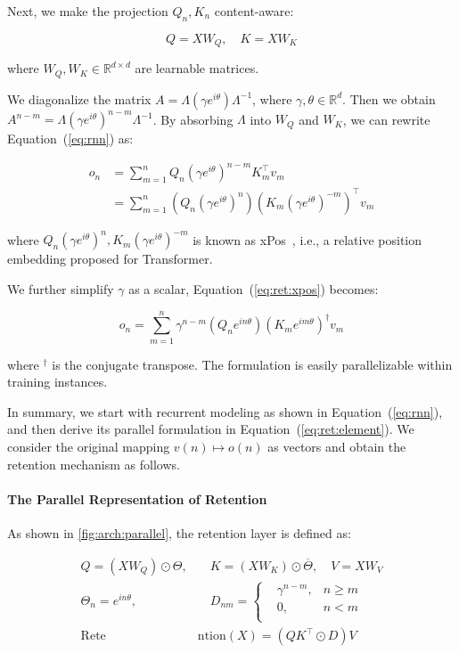 Next, we make the projection $Q_n, K_n$ content-aware:

\begin{equation}
\label{eq:content:aware}
Q = X W_Q, \quad K = X W_K
\end{equation}

where $W_Q, W_K \in \mathbb{R}^{d\times d}$ are learnable matrices.

We diagonalize the matrix $A = \Lambda(\gamma e^{i \theta})\Lambda^{-1}$, where $\gamma, \theta \in \mathbb{R}^d$.
Then we obtain $A^{n - m} = \Lambda (\gamma e^{i\theta})^{n - m} \Lambda^{-1}$.
By absorbing $\Lambda$ into $W_Q$ and $W_K$, we can rewrite Equation~(\ref{eq:rnn}) as:

\begin{equation}
\begin{aligned}
\label{eq:ret:xpos}
o_n &= \sum_{m=1}^n Q_n (\gamma e^{i\theta})^{n - m}  K_m^\intercal v_m \\
&=\sum_{m=1}^n(Q_n(\gamma e^{i\theta})^n)(K_m(\gamma e^{i\theta})^{-m})^\intercal v_m
\end{aligned}
\end{equation}

where $Q_n(\gamma e^{i\theta})^n, K_m(\gamma e^{i\theta})^{-m}$ is known as xPos~\cite{lex}, i.e., a relative position embedding proposed for Transformer.

We further simplify $\gamma$ as a scalar, Equation~(\ref{eq:ret:xpos}) becomes:

\begin{equation}
\label{eq:ret:element}
o_n = \sum_{m=1}^n \gamma^{n-m} (Q_n e^{in\theta})(K_m e^{im\theta})^\dag v_m
\end{equation}

where $^\dag$ is the conjugate transpose. The formulation is easily parallelizable within training instances.

In summary, we start with recurrent modeling as shown in Equation~(\ref{eq:rnn}), and then derive its parallel formulation in Equation~(\ref{eq:ret:element}).
We consider the original mapping $v(n) \mapsto o(n)$ as vectors and obtain the retention mechanism as follows.

\paragraph{The Parallel Representation of Retention} As shown in \ref{fig:arch:parallel}, the retention layer is defined as:

\begin{equation}
\begin{aligned}
\label{eq:ret:parallel}
Q = (X W_Q) \odot \Theta ,&\quad K = (X W_K) \odot \overline{\Theta} ,\quad V = X W_V \\
\Theta_n = e^{in\theta},& \quad
D_{nm} =
\left\{
\begin{aligned}
& \gamma^{n-m}, &n\ge m \\
& 0, &n < m \\
\end{aligned}
\right.
\\
\mathrm{Rete}&\mathrm{ntion}(X) = (Q K^\intercal \odot D)V
\end{aligned}
\end{equation}

